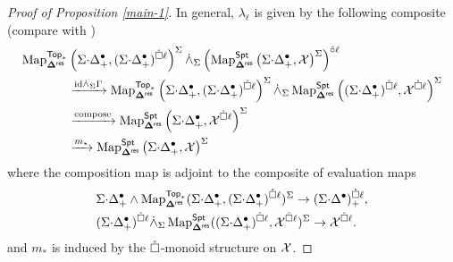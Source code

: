 \begin{proof}[Proof of Proposition \ref{main-1}]
In general, $\lambda_{\ell}$ is given by the following composite (compare with \cite[(1.13)]{AC-coalg}) \begin{align*}
    \Map_{\Dres}^{\Top} &\left(\SD_+, (\SD_+)^{\boxcirc \ell}\right)^{\Sigma}\dot{\wedge}_{\Sigma}  \left(\Map_{\Dres}^{\Spt}\left(\SD_+, \Cal{X}\right)^{\Sigma}\right)^{\circhat \ell}\\
    &
    \xrightarrow{\id\dot{\wedge}_{\Sigma}  \Gamma} 
    \Map_{\Dres}^{\Top}\left(\SD_+, (\SD_+)^{\boxcirc\ell} \right)^{\Sigma} \dot{\wedge}_{\Sigma}  \Map_{\Dres}^{\Spt}\left((\SD_+)^{\boxcirc \ell}, \Cal{X}^{\boxcirc \ell}\right)^{\Sigma} 
    \\
    &
    \xrightarrow{\text{compose}} \Map_{\Dres}^{\Spt}\left(\SD_+, \Cal{X}^{\boxcirc \ell} \right)^{\Sigma} 
    \\
    & \xrightarrow{m_*} \Map_{\Dres}^{\Spt}\left(\SD_+, \Cal{X}\right)^{\Sigma}
\end{align*}
where the composition map is adjoint to the composite of evaluation maps
\begin{align}
    &\SD_+ \wedge \Map_{\Dres}^{\Top}( \SD_+, (\SD_+)^{\boxcirc \ell} )^{\Sigma} \to  (\SD)^{\boxcirc \ell}_+, \\
    &(\SD_+)^{\boxcirc \ell} \dot{\wedge}_{\Sigma} \Map_{\Dres}^{\Spt} ((\SD_+)^{\boxcirc \ell}, \Cal{X}^{\boxcirc \ell} )^{\Sigma} \to \Cal{X}^{\boxcirc \ell}.
    \nonumber \end{align}
and $m_*$ is induced by the $\boxcirc$-monoid structure on $\Cal{X}$.





\end{proof}
